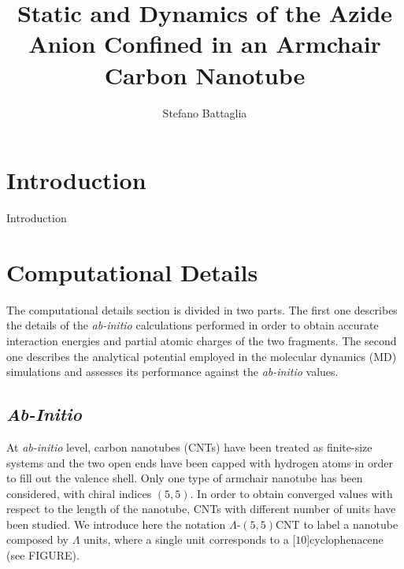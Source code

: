 \documentclass[utf8]{article}
\title{\LARGE Static and Dynamics of the Azide Anion Confined in an Armchair Carbon Nanotube}
\author{Stefano Battaglia}
\begin{document}
\maketitle

\section{Introduction}
Introduction

\section{Computational Details}
The computational details section is divided in two parts.
The first one describes the details of the \textit{ab-initio} calculations performed in order to obtain accurate interaction energies and partial atomic charges of the two fragments.
The second one describes the analytical potential employed in the molecular dynamics (MD) simulations and assesses its performance against the \textit{ab-initio} values.


\subsection{\textit{Ab-Initio}}
At \textit{ab-initio} level, carbon nanotubes (CNTs) have been treated as finite-size systems and the two open ends have been capped with hydrogen atoms in order to fill out the valence shell. Only one type of armchair nanotube has been considered, with chiral indices $(5,5)$. In order to obtain converged values with respect to the length of the nanotube, CNTs with different number of units have been studied. We introduce here the notation $\Lambda$-$(5,5)$CNT to label a nanotube composed by $\Lambda$ units, where a single unit corresponds to a [$10$]cyclophenacene (see FIGURE).
\end{document}
